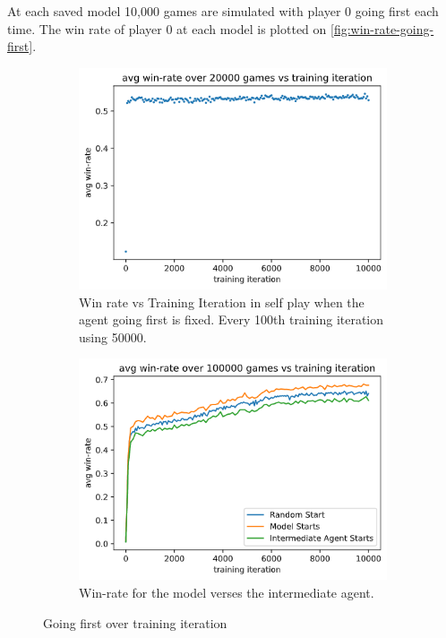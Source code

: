 \documentclass[../main.tex]{subfiles}
\begin{document}
At each saved model 10,000 games are simulated with player 0 going first each time. The win rate of player 0 at each model is plotted on \autoref{fig:win-rate-going-first}.

\begin{figure}
    \centering
    \begin{subfigure}[t]{0.49\textwidth}
        \centering
        \includegraphics[width=\textwidth,keepaspectratio]{images/results/going_first_over_time.png}
        \caption{Win rate vs Training Iteration in self play when the agent going first is fixed. Every 100th training iteration using 50000.}
        \label{fig:win-rate-going-first}
    \end{subfigure}
    \hfill
    \begin{subfigure}[t]{0.49\textwidth}
        \centering
        \includegraphics[width=\textwidth,keepaspectratio]{images/results/winrate_vs_int_going_first.png}
        \caption{Win-rate for the model verses the intermediate agent. }
        \label{fig:win-rate-vs-int-going-first}
    \end{subfigure}
    \caption{Going first over training iteration}
    \label{fig:going-first-over-time}
\end{figure}
\end{document}
